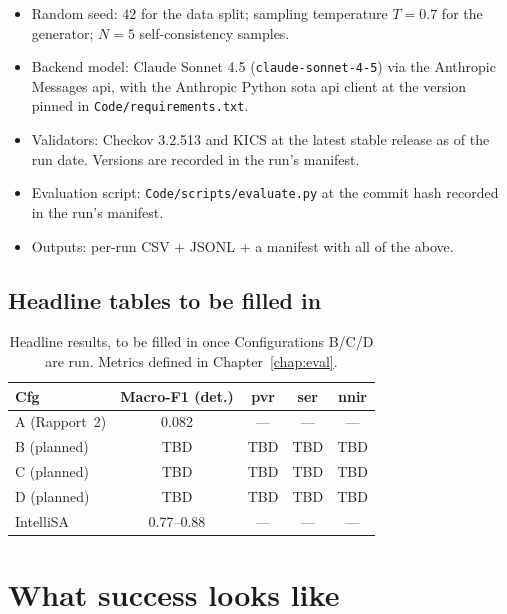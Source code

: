 \documentclass[12pt, a4paper]{report}
\begin{document}
\begin{itemize}
  \item Random seed: $42$ for the data split; sampling temperature
        $T=0.7$ for the generator; $N=5$ self-consistency samples.
  \item Backend model: Claude Sonnet 4.5 (\texttt{claude-sonnet-4-5})
        via the Anthropic Messages \gls{api}, with the Anthropic
        Python \gls{sota} \gls{api} client at the version pinned in
        \texttt{Code/requirements.txt}.
  \item Validators: Checkov 3.2.513 and KICS at the latest stable release
        as of the run date. Versions are recorded in the run's manifest.
  \item Evaluation script: \texttt{Code/scripts/evaluate.py} at the
        commit hash recorded in the run's manifest.
  \item Outputs: per-run CSV + JSONL + a manifest with all of the above.
\end{itemize}

\subsection{Headline tables to be filled in}

\begin{table}[H]
  \centering
  \caption{Headline results, to be filled in once Configurations B/C/D
    are run. Metrics defined in Chapter~\ref{chap:eval}.}
  \label{tab:headline}
  \small
  \begin{tabular}{lcccc}
    \toprule
    \textbf{Cfg} & \textbf{Macro-F1 (det.)} & \textbf{\gls{pvr}} & \textbf{\gls{ser}} & \textbf{\gls{nnir}} \\
    \midrule
    A (Rapport~2)  & 0.082 & --- & --- & --- \\
    B (planned)    & TBD & TBD & TBD & TBD \\
    C (planned)    & TBD & TBD & TBD & TBD \\
    D (planned)    & TBD & TBD & TBD & TBD \\
    \midrule
    IntelliSA~\citep{intellisa2026} & 0.77--0.88 & --- & --- & --- \\
    \bottomrule
  \end{tabular}
\end{table}

\section{What success looks like}
\end{document}

